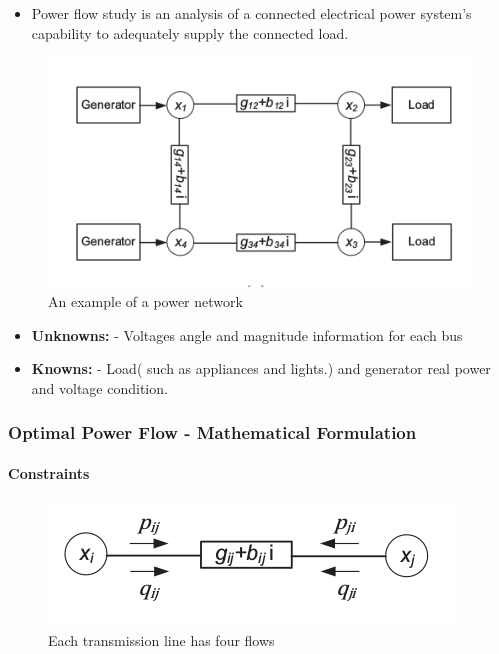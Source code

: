 \documentclass[11pt]{article}
\makeatletter
\def\maxwidth{\ifdim\Gin@nat@width>\linewidth\linewidth
    \else\Gin@nat@width\fi}
\let\Oldincludegraphics\includegraphics
\renewcommand{\includegraphics}[1]{\Oldincludegraphics[width=.8\maxwidth]{#1}}
\providecommand{\tightlist}{%
      \setlength{\itemsep}{0pt}\setlength{\parskip}{0pt}}
\makeatother
\begin{document}
\begin{itemize}
\tightlist
\item
  Power flow study is an analysis of a connected electrical power
  system's capability to adequately supply the connected load.
\end{itemize}

\begin{figure}
\centering
\includegraphics{Power_Network.png}
\caption{An example of a power network}
\end{figure}

\begin{itemize}
\tightlist
\item
  \textbf{Unknowns: } - Voltages angle and magnitude information for
  each bus
\item
  \textbf{Knowns: } - Load( such as appliances and lights.) and
  generator real power and voltage condition. 
\end{itemize}

    \subsubsection{Optimal Power Flow - Mathematical
Formulation}\label{optimal-power-flow---mathematical-formulation}

    \paragraph{Constraints}\label{constraints}

\begin{figure}
\centering
\includegraphics{Power_Network_2.png}
\caption{Each transmission line has four flows}
\end{figure}
\end{document}
